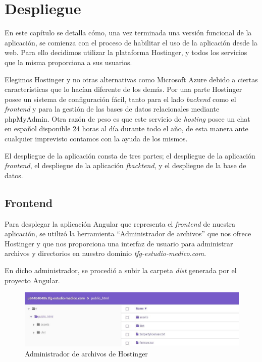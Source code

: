 \chapter{Despliegue}
    En este capítulo se detalla cómo, una vez terminada una versión funcional de la aplicación, se comienza con el proceso de habilitar el uso de la aplicación desde la web. Para ello decidimos utilizar la plataforma Hostinger\cite{hostinger}, y todos los servicios que la misma proporciona a sus usuarios.
    \newline
    
    Elegimos Hostinger y no otras alternativas como Microsoft Azure\cite{azure} debido a ciertas características que lo hacían diferente de los demás. Por una parte Hostinger posee un sistema de  configuración fácil, tanto para el lado \textit{backend} como el \textit{frontend} y para la gestión de las bases de datos relacionales mediante phpMyAdmin. Otra razón de peso es que este servicio de \textit{hosting} posee un chat en español disponible 24 horas al día durante todo el año, de esta manera ante cualquier imprevisto contamos con la ayuda de los mismos. \newline
    
    El despliegue de la aplicación consta de tres partes; el despliegue de la aplicación \textit{frontend}, el despliegue de la aplicación \textit{fbacktend}, y el despliegue de la base de datos.
    
    \section{Frontend}
    Para desplegar la aplicación Angular que representa el \textit{frontend} de nuestra aplicación, se utilizó la herramienta ``Administrador de archivos'' que nos ofrece Hostinger y que nos proporciona una interfaz de usuario para administrar archivos y directorios en nuestro dominio \textit{tfg-estudio-medico.com}.
    \newline
    
    En dicho administrador, se procedió a subir la carpeta \textit{dist} generada por el proyecto Angular.
    
     \begin{figure}[h]
    \centering
     \includegraphics[width=1\textwidth]{images/administradorarchivos3.jpg}
    \caption{Administrador de archivos de Hostinger}
    \end{figure}
    

